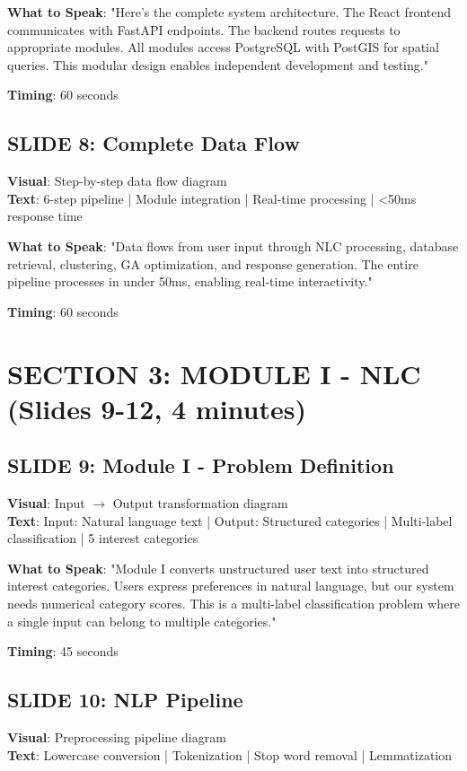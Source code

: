 \documentclass[12pt]{article}
\begin{document}
\textbf{What to Speak}:
"Here's the complete system architecture. The React frontend communicates with FastAPI endpoints. The backend routes requests to appropriate modules. All modules access PostgreSQL with PostGIS for spatial queries. This modular design enables independent development and testing."

\textbf{Timing}: 60 seconds

\subsection{SLIDE 8: Complete Data Flow}
\textbf{Visual}: Step-by-step data flow diagram \\
\textbf{Text}: 6-step pipeline | Module integration | Real-time processing | <50ms response time

\textbf{What to Speak}:
"Data flows from user input through NLC processing, database retrieval, clustering, GA optimization, and response generation. The entire pipeline processes in under 50ms, enabling real-time interactivity."

\textbf{Timing}: 60 seconds

\section{SECTION 3: MODULE I - NLC (Slides 9-12, 4 minutes)}

\subsection{SLIDE 9: Module I - Problem Definition}
\textbf{Visual}: Input $\rightarrow$ Output transformation diagram \\
\textbf{Text}: Input: Natural language text | Output: Structured categories | Multi-label classification | 5 interest categories

\textbf{What to Speak}:
"Module I converts unstructured user text into structured interest categories. Users express preferences in natural language, but our system needs numerical category scores. This is a multi-label classification problem where a single input can belong to multiple categories."

\textbf{Timing}: 45 seconds

\subsection{SLIDE 10: NLP Pipeline}
\textbf{Visual}: Preprocessing pipeline diagram \\
\textbf{Text}: Lowercase conversion | Tokenization | Stop word removal | Lemmatization
\end{document}

